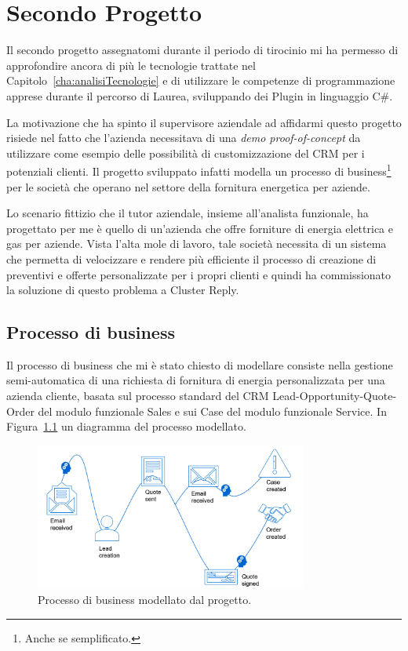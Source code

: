 \graphicspath{{./chapters/04/assets/}}
\chapter{Secondo Progetto}
Il secondo progetto assegnatomi durante il periodo di tirocinio mi ha permesso di approfondire ancora di più le tecnologie trattate nel Capitolo~\ref{cha:analisiTecnologie} e di utilizzare le competenze di programmazione apprese durante il percorso di Laurea, sviluppando dei Plugin in linguaggio C\#. 

La motivazione che ha spinto il supervisore aziendale ad affidarmi questo progetto risiede nel fatto che l'azienda necessitava di una \textit{demo proof-of-concept} da utilizzare come esempio delle possibilità di customizzazione del CRM per i potenziali clienti. Il progetto sviluppato infatti modella un processo di business\footnote{Anche se semplificato.} per le società che operano nel settore della fornitura energetica per aziende. 

Lo scenario fittizio che il tutor aziendale, insieme all'analista funzionale, ha progettato per me è quello di un'azienda che offre forniture di energia elettrica e gas per aziende.
Vista l'alta mole di lavoro, tale società necessita di un sistema che permetta di velocizzare e rendere più efficiente il processo di creazione di preventivi e offerte personalizzate per i propri clienti e quindi ha commissionato la soluzione di questo problema a Cluster Reply.

\section{Processo di business}
Il processo di business che mi è stato chiesto di modellare consiste nella gestione semi-automatica di una richiesta di fornitura di energia personalizzata per una azienda cliente, basata sul processo standard del CRM Lead-Opportunity-Quote-Order del modulo funzionale Sales e sui Case del modulo funzionale Service.
In Figura~\ref{fig:processoUtilities} un diagramma del processo modellato. 

\begin{figure}[ht]
  \centering
  \includegraphics[width=0.8\textwidth]{processo-utilities.png}
  \caption{Processo di business modellato dal progetto.}
  \label{fig:processoUtilities}
\end{figure}

